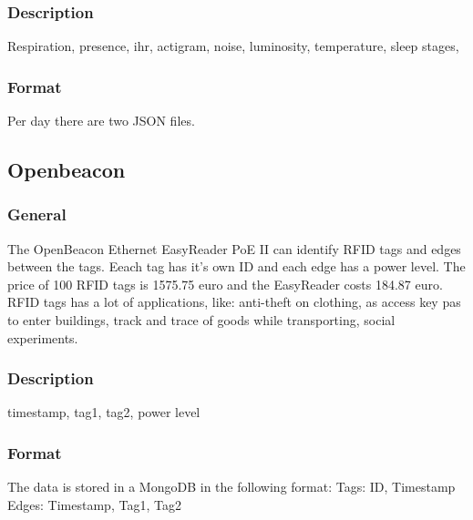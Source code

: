 			\subsubsection{Description}
				Respiration, presence, ihr, actigram, noise, luminosity, temperature, sleep stages, 
			\subsubsection{Format}
			Per day there are two JSON files.
			\lstset { 
				basicstyle = \footnotesize,
				tabsize = 2
			}


	\subsection{Openbeacon}
		\subsubsection{General}
			The OpenBeacon Ethernet EasyReader PoE II can identify RFID tags and edges between the tags. Eeach tag has it's own ID and each edge has a power level. The price of 100 RFID tags is 1575.75 euro and the EasyReader costs 184.87 euro. RFID tags has a lot of applications, like: anti-theft on clothing, as access key pas to enter buildings, track and trace of goods while transporting, social experiments.
		\subsubsection{Description}
		timestamp, tag1, tag2, power level

		\subsubsection{Format}
		The data is stored in a MongoDB in the following format:
		Tags: ID, Timestamp
		Edges: Timestamp, Tag1, Tag2
